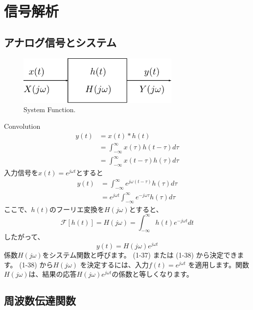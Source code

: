 \documentclass[book]{jlreq}
\begin{document}
\appendix
\chapter{信号解析}
\section{アナログ信号とシステム}
%
\begin{figure}[hbt]
    \begin{center}
        \includegraphics[width=8cm,clip]{figs/System_Func.pdf}
        \caption{System Function.}
        \label{fig:sys_func}
    \end{center}
\end{figure}
%
Convolution
%
\begin{align}
    y(t) & =x(t)\ast h(t)                                \\
         & =\int_{-\infty}^{\infty}x(\tau)h(t-\tau)d\tau \\
         & =\int_{-\infty}^{\infty}x(t-\tau)h(\tau)d\tau
\end{align}
%
入力信号を$x(t)=e^{j\omega t}$とすると
%
\begin{align}
    y(t) & = \int_{-\infty}^{\infty}e^{j\omega(t-\tau)}h(\tau)d\tau           \\
         & = e^{j\omega t}\int_{-\infty}^{\infty}e^{-j\omega\tau}h(\tau)d\tau
\end{align}
%
ここで、$h(t)$のフーリエ変換を$H(j\omega)$とすると、
%
\begin{equation}
    \mathcal{F}[h(t)] = H(j\omega) = \int_{-\infty}^{\infty}h(t)e^{-j\omega t}dt
\end{equation}
%
したがって、
%
\begin{equation}
    y(t) = H(j\omega)e^{j\omega t}
\end{equation}
%
係数$H(j\omega)$をシステム関数と呼びます。 (1-37) または (1-38) から決定できます。 (1-38) から$H(j\omega)$ を決定するには、入力$f(t)=e^{j\omega t}$ を適用します。関数$H(j\omega)$は、結果の応答$H(j\omega)e^{j\omega t}$の係数と等しくなります。

\section{周波数伝達関数}
\end{document}
